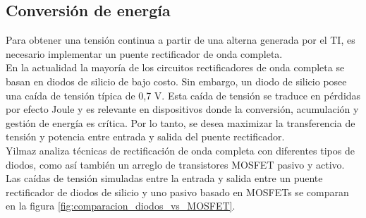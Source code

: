 \subsection{Conversión de energía}
Para obtener una tensión continua a partir de una alterna generada por el TI, es necesario implementar un puente rectificador de onda completa.\\
En la actualidad la mayoría de los circuitos rectificadores de onda completa se basan en diodos de silicio de bajo costo. Sin embargo, un diodo de silicio posee una caída de tensión típica de 0,7 V. Esta caída de tensión se traduce en pérdidas por efecto Joule y es relevante en dispositivos donde la conversión, acumulación y gestión de energía es crítica. Por lo tanto, se desea maximizar la transferencia de tensión y potencia entre entrada y salida del puente rectificador.\\
Yilmaz \citep{Yilmaz} analiza técnicas de rectificación de onda completa con diferentes tipos de diodos, como así también un arreglo de transistores MOSFET pasivo y activo. Las caídas de tensión simuladas entre la entrada y salida entre un puente rectificador de diodos de silicio y uno pasivo basado en MOSFETs se comparan en la figura \ref{fig:comparacion_diodos_vs_MOSFET}.\\

